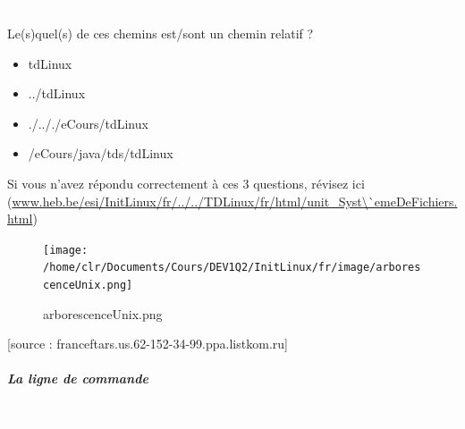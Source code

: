 \documentclass[11pt,a4paper]{article}
\begin{document}
			
		\subparagraph{} 
		
                \textcolor{white}{.} \par
            Le(s)quel(s) de ces chemins est/sont un chemin relatif ?
						
            \begin{itemize} 
        
            \item[ \ding{"6F} ] tdLinux
        
            \item[ \ding{"6F} ] ../tdLinux
        
            \item[ \ding{"6F} ] ./.././eCours/tdLinux
        
            \item[ \ding{"6F} ] /eCours/java/tds/tdLinux
        
            \end{itemize} 
        Si vous n'avez r\'epondu correctement \`a ces 3 questions, r\'evisez ici (\url{www.heb.be/esi/InitLinux/fr/../../TDLinux/fr/html/unit\_Syst\`emeDeFichiers.html})
            \par
        \begin{figure}[hbt]
				    \begin{center}
					\texttt{[image: /home/clr/Documents/Cours/DEV1Q2/InitLinux/fr/image/arborescenceUnix.png]}
						\end{center}
                
                    \caption[arborescenceUnix.png]{arborescenceUnix.png}
                \end{figure}
                    
			    
			    [source : franceftars.us.62-152-34-99.ppa.listkom.ru]
        
            \par
        
			
		\subparagraph{La ligne de commande} 
		
                \textcolor{white}{.} \par
            
\end{document}
